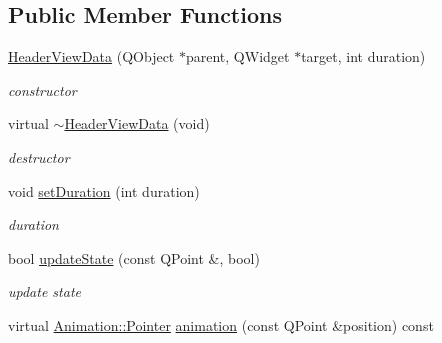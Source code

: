 \subsection*{Public Member Functions}
\begin{DoxyCompactItemize}
\item 
\mbox{\label{class_header_view_data_a139db4f82adcbd95ea1c719a6c543aa0}} 
\hyperlink{class_header_view_data_a139db4f82adcbd95ea1c719a6c543aa0}{Header\+View\+Data} (Q\+Object $\ast$parent, Q\+Widget $\ast$target, int duration)
\begin{DoxyCompactList}\small\item\em constructor \end{DoxyCompactList}\item 
\mbox{\label{class_header_view_data_a9a356bbc3fcf1c9cecc820db430bd016}} 
virtual \hyperlink{class_header_view_data_a9a356bbc3fcf1c9cecc820db430bd016}{$\sim$\+Header\+View\+Data} (void)
\begin{DoxyCompactList}\small\item\em destructor \end{DoxyCompactList}\item 
\mbox{\label{class_header_view_data_aebd8182d4ef20faf7576d131b1da9a3f}} 
void \hyperlink{class_header_view_data_aebd8182d4ef20faf7576d131b1da9a3f}{set\+Duration} (int duration)
\begin{DoxyCompactList}\small\item\em duration \end{DoxyCompactList}\item 
\mbox{\label{class_header_view_data_a0537b40d9087da5bb462dda847763a40}} 
bool \hyperlink{class_header_view_data_a0537b40d9087da5bb462dda847763a40}{update\+State} (const Q\+Point \&, bool)
\begin{DoxyCompactList}\small\item\em update state \end{DoxyCompactList}\item 
\mbox{\label{class_header_view_data_a7954c7ef66a51a21a33b49a4bfc7869c}} 
virtual \hyperlink{class_animation_ac48a8d074abd43dc3f6485353ba24e30}{Animation\+::\+Pointer} \hyperlink{class_header_view_data_a7954c7ef66a51a21a33b49a4bfc7869c}{animation} (const Q\+Point \&position) const

\end{DoxyCompactItemize}
